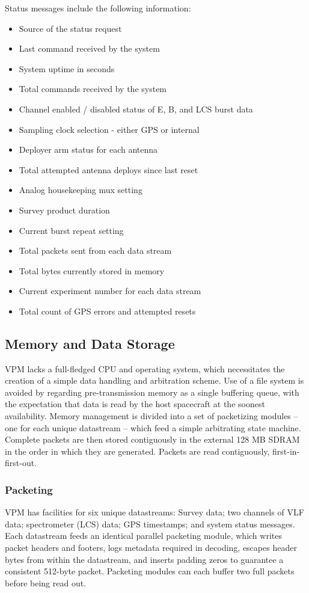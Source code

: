 Status messages include the following information:
\begin{itemize}
\item Source of the status request
\item Last command received by the system
\item System uptime in seconds
\item Total commands received by the system
\item Channel enabled / disabled status of E, B, and LCS burst data
\item Sampling clock selection - either GPS or internal
\item Deployer arm status for each antenna
\item Total attempted antenna deploys since last reset
\item Analog housekeeping mux setting
\item Survey product duration
\item Current burst repeat setting
\item Total packets sent from each data stream
\item Total bytes currently stored in memory
\item Current experiment number for each data stream
\item Total count of GPS errors and attempted resets
\end{itemize}
\subsection{Memory and Data Storage}
VPM lacks a full-fledged CPU and operating system, which necessitates the creation of a simple data handling and arbitration scheme. Use of a file system is avoided by regarding pre-transmission memory as a single buffering queue, with the expectation that data is read by the host spacecraft at the soonest availability. Memory management is divided into a set of packetizing modules -- one for each unique datastream -- which feed a simple arbitrating state machine. Complete packets are then stored contiguously in the external 128 MB SDRAM in the order in which they are generated. Packets are read contiguously, first-in-first-out. 

\subsubsection{Packeting}
VPM has facilities for six unique datastreams: Survey data; two channels of VLF data; spectrometer (LCS) data; GPS timestamps; and system status messages. Each datastream feeds an identical parallel packeting module, which writes packet headers and footers, logs metadata required in decoding, escapes header bytes from within the datastream, and inserts padding zeros to guarantee a consistent 512-byte packet. Packeting modules can each buffer two full packets before being read out.

